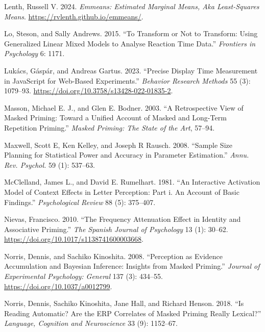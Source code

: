 \documentclass[
]{interact}
\newlength{\cslhangindent}
\newenvironment{CSLReferences}[2] %
 {\begin{list}{}{%
  \setlength{\itemindent}{0pt}
  \setlength{\leftmargin}{0pt}
  \setlength{\parsep}{0pt}
  \ifodd #1
   \setlength{\leftmargin}{\cslhangindent}
   \setlength{\itemindent}{-1\cslhangindent}
  \fi
  \setlength{\itemsep}{#2\baselineskip}}}
 {\end{list}}
\begin{document}
\begin{CSLReferences}{1}{0}
Lenth, Russell V. 2024. \emph{Emmeans: Estimated Marginal Means, Aka
Least-Squares Means}. \url{https://rvlenth.github.io/emmeans/}.

Lo, Steson, and Sally Andrews. 2015. {``To Transform or Not to
Transform: Using Generalized Linear Mixed Models to Analyse Reaction
Time Data.''} \emph{Frontiers in Psychology} 6: 1171.

Lukács, Gáspár, and Andreas Gartus. 2023. {``Precise Display Time
Measurement in JavaScript for Web-Based Experiments.''} \emph{Behavior
Research Methods} 55 (3): 1079--93.
\url{https://doi.org/10.3758/s13428-022-01835-2}.

Masson, Michael E. J., and Glen E. Bodner. 2003. {``A Retrospective View
of Masked Priming: Toward a Unified Account of Masked and Long-Term
Repetition Priming.''} \emph{Masked Priming: The State of the Art},
57--94.

Maxwell, Scott E, Ken Kelley, and Joseph R Rausch. 2008. {``Sample Size
Planning for Statistical Power and Accuracy in Parameter Estimation.''}
\emph{Annu. Rev. Psychol.} 59 (1): 537--63.

McClelland, James L., and David E. Rumelhart. 1981. {``An Interactive
Activation Model of Context Effects in Letter Perception: Part i. An
Account of Basic Findings.''} \emph{Psychological Review} 88 (5):
375--407.

Nievas, Francisco. 2010. {``The Frequency Attenuation Effect in Identity
and Associative Priming.''} \emph{The Spanish Journal of Psychology} 13
(1): 30--62. \url{https://doi.org/10.1017/s1138741600003668}.

Norris, Dennis, and Sachiko Kinoshita. 2008. {``Perception as Evidence
Accumulation and Bayesian Inference: Insights from Masked Priming.''}
\emph{Journal of Experimental Psychology: General} 137 (3): 434--55.
\url{https://doi.org/10.1037/a0012799}.

Norris, Dennis, Sachiko Kinoshita, Jane Hall, and Richard Henson. 2018.
{``Is Reading Automatic? Are the ERP Correlates of Masked Priming Really
Lexical?''} \emph{Language, Cognition and Neuroscience} 33 (9):
1152--67.


\end{CSLReferences}
\end{document}
